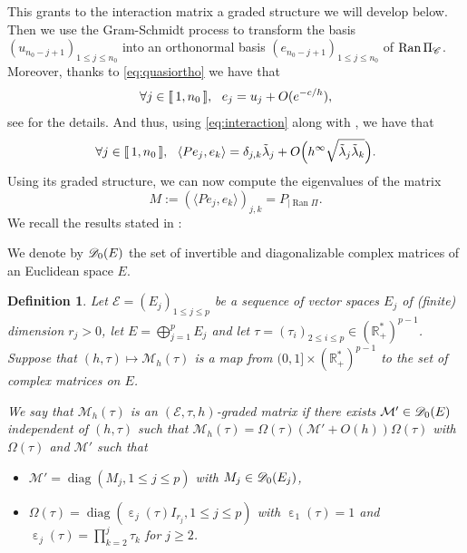 \documentclass[12pt]{amsart}
\newcommand{\diag}{\operatorname{diag}}
\newcommand{\R}{\mathbb R}
\newcommand{\Ran}{\operatorname{Ran}}
\def\<{\langle}
\def\>{\rangle}
\numberwithin{equation}{section}
\numberwithin{figure}{section}
\DeclareMathOperator{\eps}{\varepsilon}
\newcommand{\lb}{\operatorname{[\negthinspace [}}
\newcommand{\rb}{\operatorname{]\negthinspace ]}}
\newtheorem{defin}{Definition}[section]
\def\mmm{{\mathcal M}}\def\nnn{{\mathcal N}} \def\ooo{{\mathcal O}}\def\ppp{{\mathcal P}}
\def\Er{{\mathscr E}}\def\Fr{{\mathscr F}}\def\Gr{{\mathscr G}}\def\Hr{{\mathscr H}}
\begin{document}
This grants to the interaction matrix a graded structure we will develop below. Then we use the Gram-Schmidt process to transform the basis $(u_{n_0-j+1})_{1\leq j\leq n_0}$ into an orthonormal basis $(e_{n_0-j+1})_{1\leq j\leq n_0}$ of $\Ran\Pi_\Cr$. Moreover, thanks to \eqref{eq:quasiortho} we have that
\begin{equation*}
\forall j\in\lb1,n_0\rb,\ \ e_j = u_j + O(e^{-c/h}),
\end{equation*}
see \cite[Lemma 4.11]{LePMi20} for the details. And thus, using \eqref{eq:interaction} along with \cite[Proposition 4.12]{LePMi20}, we have that
\begin{equation}\label{eq:Pee}
\forall j\in\lb1,n_0\rb,\ \ \<Pe_j,e_k\> = \delta_{j,k}\tilde{\lambda}_j + O\Big(h^\infty\sqrt{\tilde{\lambda}_j\tilde{\lambda}_k}\Big).
\end{equation}
Using its graded structure, we can now compute the eigenvalues of the matrix
\begin{equation}\label{eq:matrix}
M := (\<Pe_j,e_k\>)_{j,k} = {P}_{|\Ran\Pi}.
\end{equation}
We recall the results stated in \cite{LePMi20}:

We denote by ${\mathscr D}_0(E)$ the set of invertible and diagonalizable complex matrices of an Euclidean space $E$.

\begin{defin}\cite[Definition A.1]{LePMi20}
    Let $\Er = (E_j)_{1\leq j \leq p}$ be a sequence of vector spaces $E_j$ of (finite) dimension $r_j>0$, let $E = \bigoplus_{j=1}^pE_j$ and let $\tau = (\tau_i)_{2\leq i\leq p}\in(\R_+^*)^{p-1}$. Suppose that $(h,\tau)\mapsto \mmm_h(\tau)$ is a map from $(0,1]\times(\R_+^*)^{p-1}$ to the set of complex matrices on $E$.

    We say that $\mmm_h(\tau)$ is an $(\Er,\tau,h)$-graded matrix if there exists $\mmm'\in\Dr_0(E)$ independent of $(h,\tau)$ such that $\mmm_h(\tau) = \Omega(\tau)(\mmm' + O(h))\Omega(\tau)$ with $\Omega(\tau)$ and $\mmm'$ such that
    \begin{itemize}
        \item $\mmm' = \diag(M_j,1\leq j\leq p)$ with $M_j\in{\mathscr D}_0(E_j)$,
        \item $\Omega(\tau) = \diag(\eps_j(\tau)I_{r_j},1\leq j\leq p)$ with $\eps_1(\tau) = 1$ and $\eps_j(\tau) = \prod_{k=2}^j\tau_k$ for  $j\geq2$.
    \end{itemize}
\end{defin}
\end{document}
